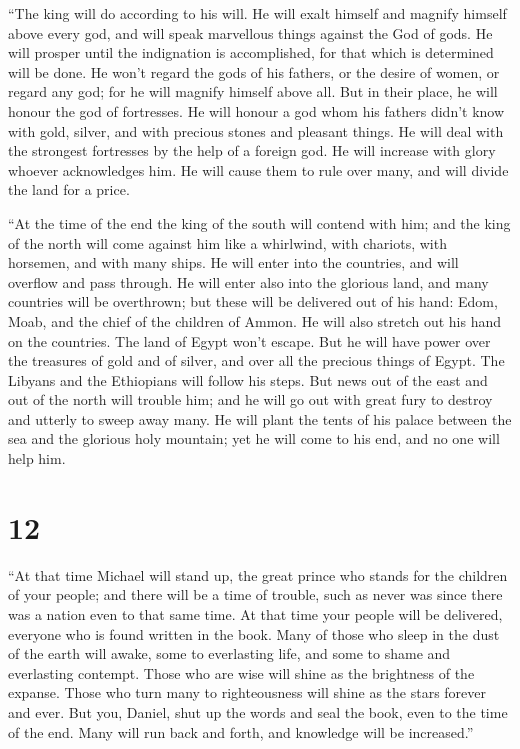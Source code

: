  ``The king will do according to his will. He will exalt
himself and magnify himself above every god, and will speak marvellous
things against the God of gods. He will prosper until the indignation is
accomplished, for that which is determined will be done. 
He won't regard the gods of his fathers, or the desire of women, or
regard any god; for he will magnify himself above all.  But
in their place, he will honour the god of fortresses. He will honour a
god whom his fathers didn't know with gold, silver, and with precious
stones and pleasant things.  He will deal with the
strongest fortresses by the help of a foreign god. He will increase with
glory whoever acknowledges him. He will cause them to rule over many,
and will divide the land for a price.

 ``At the time of the end the king of the south will
contend with him; and the king of the north will come against him like a
whirlwind, with chariots, with horsemen, and with many ships. He will
enter into the countries, and will overflow and pass through.
 He will enter also into the glorious land, and many
countries will be overthrown; but these will be delivered out of his
hand: Edom, Moab, and the chief of the children of Ammon. 
He will also stretch out his hand on the countries. The land of Egypt
won't escape.  But he will have power over the treasures of
gold and of silver, and over all the precious things of Egypt. The
Libyans and the Ethiopians will follow his steps.  But news
out of the east and out of the north will trouble him; and he will go
out with great fury to destroy and utterly to sweep away many.
 He will plant the tents of his palace between the sea and
the glorious holy mountain; yet he will come to his end, and no one will
help him.

\hypertarget{section-11}{%
\section{12}\label{section-11}}

 ``At that time Michael will stand up, the great prince who
stands for the children of your people; and there will be a time of
trouble, such as never was since there was a nation even to that same
time. At that time your people will be delivered, everyone who is found
written in the book.  Many of those who sleep in the dust of
the earth will awake, some to everlasting life, and some to shame and
everlasting contempt.  Those who are wise will shine as the
brightness of the expanse. Those who turn many to righteousness will
shine as the stars forever and ever.  But you, Daniel, shut
up the words and seal the book, even to the time of the end. Many will
run back and forth, and knowledge will be increased.''

